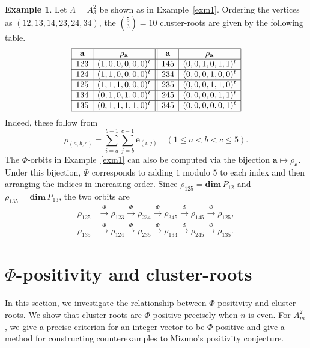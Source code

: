 \documentclass[11pt,a4paper]{amsart}
\theoremstyle{definition}
\newtheorem{example}[theorem]{Example}
\numberwithin{equation}{section}
\newcommand{\0}{\mathbf{0}}
\newcommand{\dimv}{\mathbf{dim}\,}
\begin{document}
	
	
	\begin{example}
		Let $\Lambda=A_3^2$ be shown as in Example~\ref{exm1}.
		Ordering the vertices as $(12,13,14,23,24,34)$,
		the $\binom{5}{3}=10$ cluster-roots are given by the following table.
		\begingroup
		\large
		\renewcommand{\arraystretch}{1.35}
		\setlength{\arraycolsep}{8pt}
		\[
		\begin{array}{|c|c||c|c|}
			\hline
			\mathbf a & \rho_{\mathbf a}
			& \mathbf a & \rho_{\mathbf a}\\ \hline
			123 &(1,0,0,0,0,0)^{t}&145 &(0,0,1,0,1,1)^{t}\\ \hline
			124 &(1,1,0,0,0,0)^{t}&234 &(0,0,0,1,0,0)^{t}\\ \hline
			125 &(1,1,1,0,0,0)^{t}&235 &(0,0,0,1,1,0)^{t}\\ \hline
			134 &(0,1,0,1,0,0)^{t}&245 &(0,0,0,0,1,1)^{t}\\ \hline
			135 &(0,1,1,1,1,0)^{t}&345 &(0,0,0,0,0,1)^{t}\\ \hline
		\end{array}
		\]
		\endgroup
		Indeed, these follow from
		\[
		\rho_{(a,b,c)}
		=\sum_{i=a}^{b-1}\sum_{j=b}^{c-1}\mathbf e_{(i,j)}
		\quad(1\le a<b<c\le5).
		\]	
		The $\Phi$-orbits in Example~\ref{exm1} can also be computed
		via the bijection $\mathbf a\mapsto\rho_{\mathbf a}$.
		Under this bijection, $\Phi$ corresponds to adding $1$ modulo $5$
		to each index and then arranging the indices in increasing order.
		Since $\rho_{125}=\dimv P_{12}$ and
		$\rho_{135}=\dimv P_{13}$, the two orbits are
		\[
		\begin{aligned}
			\rho_{125}
			&\xrightarrow{\Phi}\rho_{123}
			\xrightarrow{\Phi}\rho_{234}
			\xrightarrow{\Phi}\rho_{345}
			\xrightarrow{\Phi}\rho_{145}
			\xrightarrow{\Phi}\rho_{125},\\
			\rho_{135}
			&\xrightarrow{\Phi}\rho_{124}
			\xrightarrow{\Phi}\rho_{235}
			\xrightarrow{\Phi}\rho_{134}
			\xrightarrow{\Phi}\rho_{245}
			\xrightarrow{\Phi}\rho_{135}.
		\end{aligned}
		\]
	\end{example}
	
	\section{$\Phi$-positivity and cluster-roots}
	In this section, we investigate the relationship between
	$\Phi$-positivity and cluster-roots.
	We show that cluster-roots are $\Phi$-positive precisely when $n$ is
	even. For $A_m^2$, we give a precise criterion for an integer vector to be
	$\Phi$-positive and give a method for constructing counterexamples to Mizuno's positivity conjecture.
	
\end{document}

